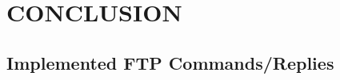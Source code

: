 \documentclass[10pt,twocolumn]{witseiepaper}
\begin{document}
\section{CONCLUSION}


%



\newpage
\onecolumn


\begin{appendix}
	
\setcounter{figure}{0} \renewcommand{\thefigure}{A\arabic{figure}}
	
\section{Implemented FTP Commands/Replies} \label{sec:comm-replyTable}


\end{appendix}
\end{document}
